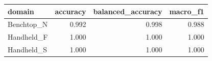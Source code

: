 \begin{tabular}{lrrr}
\toprule
domain & accuracy & balanced_accuracy & macro_f1 \\
\midrule
Benchtop_N & 0.992 & 0.998 & 0.988 \\
Handheld_F & 1.000 & 1.000 & 1.000 \\
Handheld_S & 1.000 & 1.000 & 1.000 \\
\bottomrule
\end{tabular}
